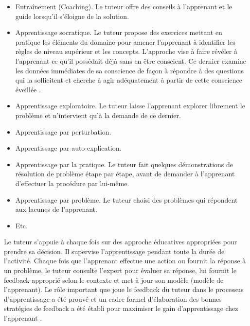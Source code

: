 \begin{itemize}
    \item Entraînement (Coaching). Le tuteur offre des conseils à l'apprenant et le guide lorsqu'il s'éloigne de la solution.
    \item Apprentissage socratique. Le tuteur propose des exercices mettant en pratique les éléments du domaine pour amener l'apprenant à identifier les règles
de niveau supérieur et les concepts. L'approche vise à faire révéler à l'apprenant ce qu'il possédait déjà sans en être conscient. Ce dernier examine les données immédiates de sa conscience de façon à répondre à des questions
qui la sollicitent et cherche à agir adéquatement à partir de cette conscience
éveillée .
    \item Apprentissage exploratoire. Le tuteur laisse l'apprenant explorer librement
le problème et n'intervient qu'à la demande de ce dernier.
    \item Apprentissage par perturbation.
    \item Apprentissage par auto-explication.
    \item Apprentissage par la pratique. Le tuteur fait quelques démonstrations de
résolution de problème étape par étape, avant de demander à l'apprenant d'effectuer la procédure par lui-même.
    \item Apprentissage par problème. Le tuteur choisi des problèmes qui répondent aux lacunes de l'apprenant.
    \item Etc.
\end{itemize}

Le tuteur s'appuie à chaque fois sur des approche éducatives appropriées pour prendre sa décision. Il supervise l'apprentissage pendant toute la durée de l'activité. Chaque fois que l'apprenant effectue une action ou fournit la réponse à un problème, le tuteur consulte l'expert pour évaluer sa réponse, lui fournit le
feedback approprié selon le contexte et met à jour son modèle (modèle de l'apprenant). Le rôle important que joue le feedback du tuteur dans le processus d'apprentissage a été prouvé et un cadre formel d'élaboration des bonnes stratégies de feedback \cite{narciss2008feedback} a été établi pour maximiser le gain d'apprentissage chez l'apprenant .


